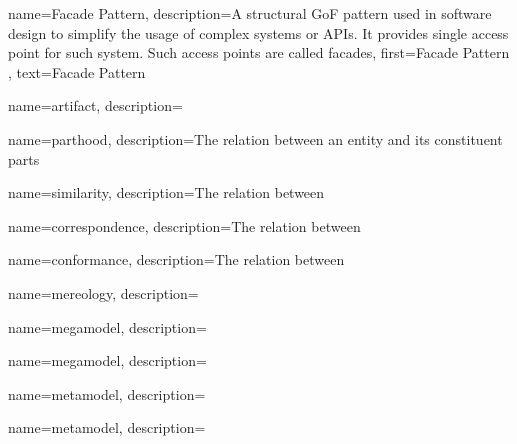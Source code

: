 {
    name={Facade Pattern},
    description={A structural \gls{GoF} pattern used in software design to simplify the usage of complex systems or \glspl{API}. It provides single access point for such system. Such access points are called facades},
    first={Facade Pattern \cite{Gamma:1995:DPE:186897}},
    text={Facade Pattern}
}

{
    name={artifact},
    description={}
}

{
    name={parthood},
    description={The relation between an entity and its constituent parts}
}

{
    name={similarity},
    description={The relation between }
}

{
    name={correspondence},
    description={The relation between }
}

{
    name={conformance},
    description={The relation between }
}

{
    name={mereology},
    description={}
}

{
    name={megamodel},
    description={}
}

{
    name={megamodel},
    description={}
}

{
    name={metamodel},
    description={}
}

{
    name={metamodel},
    description={}
}